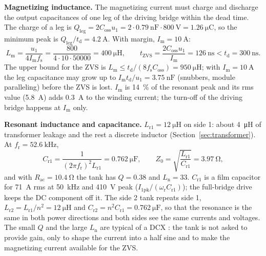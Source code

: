 \documentclass[12pt,a4paper]{scrartcl}
\newcommand{\ped}[1]{_{\mathrm{#1}}}
\begin{document}
\begin{onehalfspace}
\noindent\textbf{Magnetizing inductance.} The magnetizing current must charge and discharge the output capacitances of one leg of the driving bridge within the dead time. The charge of a leg is $Q\ped{leg} = 2 C\ped{oss} u\ped{1} = 2 \cdot \SI{0.79}{\nano\farad} \cdot \SI{800}{\volt} = \SI{1.26}{\micro\coulomb}$, so the minimum peak is $Q\ped{leg}/t\ped{d} = \SI{4.2}{\ampere}$. With margin, $I\ped{m} = \SI{10}{\ampere}$:
\begin{equation}
	L\ped{m} = \frac{u\ped{1}}{4 I\ped{m} f\ped{s}} = \frac{800}{4 \cdot 10 \cdot 50000} = \SI{400}{\micro\henry},
	\qquad t\ped{ZVS} = \frac{2 C\ped{oss} u\ped{1}}{I\ped{m}} = \SI{126}{\nano\second} < t\ped{d} = \SI{300}{\nano\second}.
	\label{eq:lm}
\end{equation}
The upper bound for the ZVS is $L\ped{m} \le t\ped{d}/(8 f\ped{s} C\ped{oss}) = \SI{950}{\micro\henry}$; with $I\ped{m} = \SI{10}{\ampere}$ the leg capacitance may grow up to $I\ped{m} t\ped{d}/u\ped{1} = \SI{3.75}{\nano\farad}$ (snubbers, module paralleling) before the ZVS is lost. $I\ped{m}$ is \SI{14}{\percent} of the resonant peak and its rms value (\SI{5.8}{\ampere}) adds \SI{0.3}{\ampere} to the winding current; the turn-off of the driving bridge happens at $I\ped{m}$ only.

\noindent\textbf{Resonant inductance and capacitance.} $L\ped{r1} = \SI{12}{\micro\henry}$ on side 1: about \SI{4}{\micro\henry} of transformer leakage and the rest a discrete inductor (Section~\ref{sec:transformer}). At $f\ped{r} = \SI{52.6}{\kilo\hertz}$,
\begin{equation}
	C\ped{r1} = \frac{1}{(2\pi f\ped{r})^2 L\ped{r1}} = \SI{0.762}{\micro\farad}, \qquad
	Z\ped{0} = \sqrt{\frac{L\ped{r1}}{C\ped{r1}}} = \SI{3.97}{\ohm},
	\label{eq:tank}
\end{equation}
and with $R\ped{ac} = \SI{10.4}{\ohm}$ the tank has $Q = 0.38$ and $L\ped{n} = 33$. $C\ped{r1}$ is a film capacitor for \SI{71}{\ampere} rms at \SI{50}{\kilo\hertz} and \SI{410}{\volt} peak ($I\ped{1pk}/(\omega\ped{r} C\ped{r1})$); the full-bridge drive keeps the DC component off it. The side 2 tank repeats side 1, $L\ped{r2} = L\ped{r1}/n^2 = \SI{12}{\micro\henry}$ and $C\ped{r2} = n^2 C\ped{r1} = \SI{0.762}{\micro\farad}$, so that the resonance is the same in both power directions and both sides see the same currents and voltages. The small $Q$ and the large $L\ped{n}$ are typical of a DCX \cite{jung2013}: the tank is not asked to provide gain, only to shape the current into a half sine and to make the magnetizing current available for the ZVS.


\end{onehalfspace}
\end{document}

